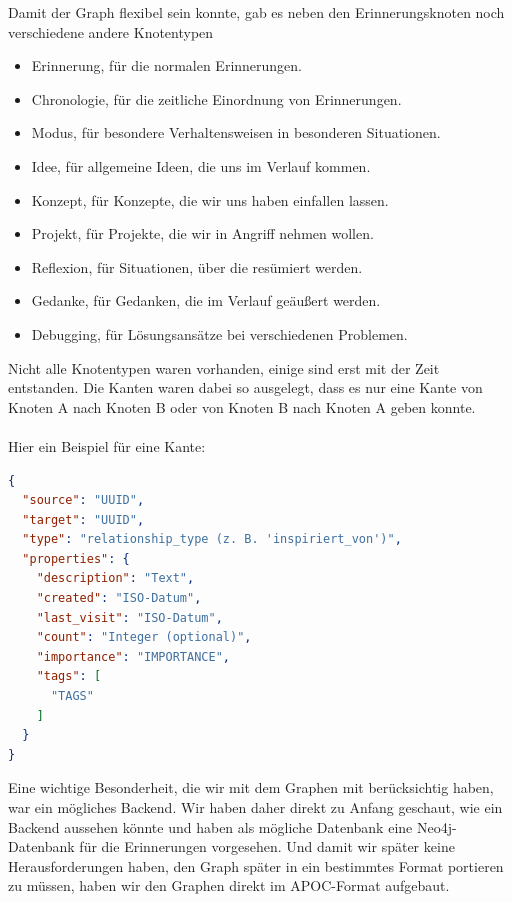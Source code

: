 Damit der Graph flexibel sein konnte, gab es neben den Erinnerungsknoten noch verschiedene andere Knotentypen

\begin{itemize}
  \item Erinnerung, für die normalen Erinnerungen.
  \item Chronologie, für die zeitliche Einordnung von Erinnerungen.
  \item Modus, für besondere Verhaltensweisen in besonderen Situationen.
  \item Idee, für allgemeine Ideen, die uns im Verlauf kommen.
  \item Konzept, für Konzepte, die wir uns haben einfallen lassen.
  \item Projekt, für Projekte, die wir in Angriff nehmen wollen.
  \item Reflexion, für Situationen, über die resümiert werden.
  \item Gedanke, für Gedanken, die im Verlauf geäußert werden.
  \item Debugging, für Lösungsansätze bei verschiedenen Problemen.
\end{itemize}

Nicht alle Knotentypen waren vorhanden, einige sind erst mit der Zeit entstanden. Die Kanten waren dabei so ausgelegt, dass es nur eine Kante von Knoten A nach Knoten B oder von Knoten B nach Knoten A geben konnte.\\
\\
Hier ein Beispiel für eine Kante:

\begin{lstlisting}[language=json, caption=Kante]
{
  "source": "UUID",
  "target": "UUID",
  "type": "relationship_type (z. B. 'inspiriert_von')",
  "properties": {
    "description": "Text",
    "created": "ISO-Datum",
    "last_visit": "ISO-Datum",
    "count": "Integer (optional)",
    "importance": "IMPORTANCE",
    "tags": [
      "TAGS"
    ]
  }
}
\end{lstlisting}

Eine wichtige Besonderheit, die wir mit dem Graphen mit berücksichtig haben, war ein mögliches Backend. Wir haben daher direkt zu Anfang geschaut, wie ein Backend aussehen könnte und haben als mögliche Datenbank eine Neo4j-Datenbank für die Erinnerungen vorgesehen. Und damit wir später keine Herausforderungen haben, den Graph später in ein bestimmtes Format portieren zu müssen, haben wir den Graphen direkt im APOC-Format aufgebaut.

